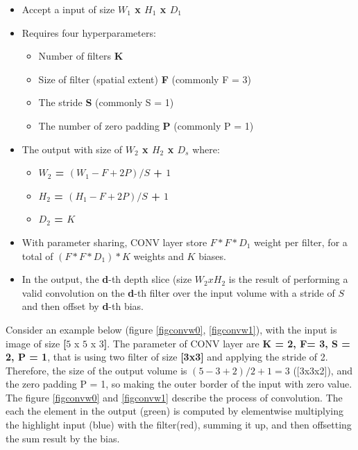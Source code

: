 \begin{itemize}
	\item Accept a input of size \textbf{$W_1$ x $H_1$ x $D_1$}
	\item Requires four hyperparameters:
		\begin{itemize}
			\item Number of filters \textbf{K}
			\item Size of filter (spatial extent) \textbf{F} (commonly F = 3)
			\item The stride \textbf{S} (commonly S = 1)
			\item The number of zero padding \textbf{P} (commonly P = 1)
		\end{itemize}
	\item The output with size of \textbf{$W_2$ x $H_2$ x $D_s$} where:
		\begin{itemize}
			\item \textbf{$W_2$ = $(W_1 - F + 2P)/S$ + $1$}
			\item \textbf{$H_2$ = $(H_1 - F + 2P)/S$ + $1$}
			\item \textbf{$D_2$ = $K$}
		\end{itemize}
	\item With parameter sharing, CONV layer store \textbf{$F * F * D_1$} weight per filter, for a total of \textbf{$(F * F * D_1) * K$} weights and \textbf{$K$} biases.
	\item In the output, the \textbf{d}-th depth slice (size \textbf{$W_2 x H_2$} is the result of performing a valid convolution on the \textbf{d}-th filter over the input volume with a stride of \textbf{$S$} and then offset by \textbf{d}-th bias.
\end{itemize}
Consider an example below (figure \ref{figconvw0}, \ref{figconvw1}), with the input is image of size \textbf{[$5$} x \textbf{$5$} x \textbf{$3$]}. The parameter of CONV layer are \textbf{K = 2, F= 3, S = 2, P = 1}, that is using two filter of size \textbf{[3x3]} and applying the stride of 2. Therefore, the size of the output volume is $(5 - 3 + 2)/2 + 1 = 3$ ([3x3x2]), and the zero padding P = 1, so making the outer border of the input with zero value. The figure \ref{figconvw0} and \ref{figconvw1} describe the process of convolution. The each the element in the output (green) is computed by elementwise multiplying the highlight input (blue) with the filter(red), summing it up, and then offsetting the sum result by the bias.

